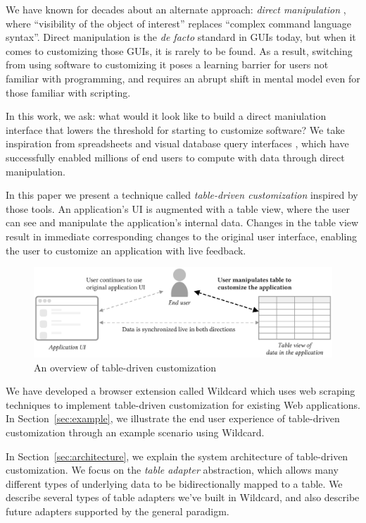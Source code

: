 \documentclass[sigplan,screen,10pt,anonymous,review]{acmart}
\begin{document}
We have known for decades about an alternate approach: \emph{direct
manipulation} \citep{shneiderman1983}, where ``visibility of the object
of interest'' replaces ``complex command language syntax''. Direct
manipulation is the \emph{de facto} standard in GUIs today, but when it
comes to customizing those GUIs, it is rarely to be found. As a result,
switching from using software to customizing it poses a learning barrier
for users not familiar with programming, and requires an abrupt shift in
mental model even for those familiar with scripting.

In this work, we ask: what would it look like to build a direct
maniulation interface that lowers the threshold for starting to
customize software? We take inspiration from spreadsheets and visual
database query interfaces \citep{bakke2016, 2020a}, which have
successfully enabled millions of end users to compute with data through
direct manipulation.

In this paper we present a technique called \emph{table-driven
customization} inspired by those tools. An application's UI is augmented
with a table view, where the user can see and manipulate the
application's internal data. Changes in the table view result in
immediate corresponding changes to the original user interface, enabling
the user to customize an application with live feedback.

\begin{figure}
\hypertarget{fig:overview}{%
\centering
\includegraphics[width=\textwidth]{media/overview.eps}
\caption{An overview of table-driven customization}\label{fig:overview}
}
\end{figure}

We have developed a browser extension called Wildcard which uses web
scraping techniques to implement table-driven customization for existing
Web applications. In Section~\ref{sec:example}, we illustrate the end
user experience of table-driven customization through an example
scenario using Wildcard.

In Section~\ref{sec:architecture}, we explain the system architecture of
table-driven customization. We focus on the \emph{table adapter}
abstraction, which allows many different types of underlying data to be
bidirectionally mapped to a table. We describe several types of table
adapters we've built in Wildcard, and also describe future adapters
supported by the general paradigm.
\end{document}
